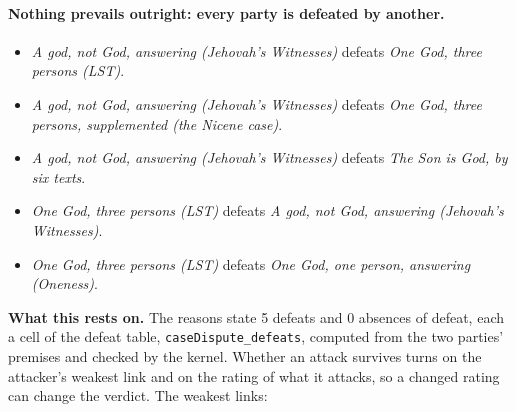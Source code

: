 \documentclass[11pt,paper=\testimonypaper,DIV=13,parskip=false]{scrartcl}
\begin{document}
\paragraph{Nothing prevails outright: every party is defeated by another.}
\begin{itemize}
\item \emph{A god, not God, answering (Jehovah’s Witnesses)} defeats \emph{One God, three persons (LST)}.
\item \emph{A god, not God, answering (Jehovah’s Witnesses)} defeats \emph{One God, three persons, supplemented (the Nicene case)}.
\item \emph{A god, not God, answering (Jehovah’s Witnesses)} defeats \emph{The Son is God, by six texts}.
\item \emph{One God, three persons (LST)} defeats \emph{A god, not God, answering (Jehovah’s Witnesses)}.
\item \emph{One God, three persons (LST)} defeats \emph{One God, one person, answering (Oneness)}.
\end{itemize}
\par\noindent\textbf{What this rests on.} The reasons state 5 defeats and 0 absences of defeat, each a cell of the defeat table, \texttt{case\allowbreak{}Dispute\_\allowbreak{}defeats}, computed from the two parties' premises and checked by the kernel. Whether an attack survives turns on the attacker's weakest link and on the rating of what it attacks, so a changed rating can change the verdict. The weakest links:
\end{document}

